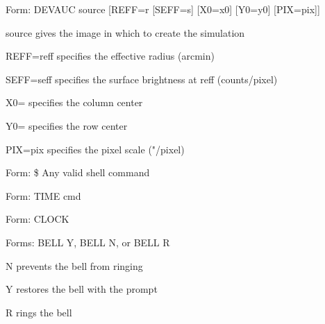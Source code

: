 {\newpage\clearpage
{}%
\begin{command}
  \item[Form: DEVAUC source [REFF=r] [SEFF=s] [X0=x0] [Y0=y0] 
       [PIX=pix]\hfill]{}
  \item[source]{gives the image in which to create the simulation}
  \item[REFF=reff]{specifies the effective radius (arcmin)}
  \item[SEFF=seff]{specifies the surface brightness at reff (counts/pixel)}
  \item[X0=]{specifies the column center}
  \item[Y0=]{specifies the row center}
  \item[PIX=pix]{specifies the pixel scale ("/pixel)}
\end{command}%
\lthtmlfigureZ
\lthtmlcheckvsize\clearpage}

{\newpage\clearpage
{}%
\begin{command}
  \item[Form: \$ Any valid shell command\hfill]{}
\end{command}%
\lthtmlfigureZ
\lthtmlcheckvsize\clearpage}

{\newpage\clearpage
{}%
\begin{command}
  \item[Form: TIME cmd\hfill]{}
\end{command}%
\lthtmlfigureZ
\lthtmlcheckvsize\clearpage}

{\newpage\clearpage
{}%
\begin{command}
  \item[Form: CLOCK\hfill]{}
\end{command}%
\lthtmlfigureZ
\lthtmlcheckvsize\clearpage}

{\newpage\clearpage
{}%
\begin{command}
  \item[Forms: BELL Y, BELL N, or BELL R\hfill]{}
\end{command}%
\lthtmlfigureZ
\lthtmlcheckvsize\clearpage}

{\newpage\clearpage
{}%
\begin{example}
  \item[N\hfill]{prevents the bell from ringing}
  \item[Y\hfill]{restores the bell with the prompt}
  \item[R\hfill]{rings the bell}
\end{example}%
\lthtmlfigureZ
\lthtmlcheckvsize\clearpage}



